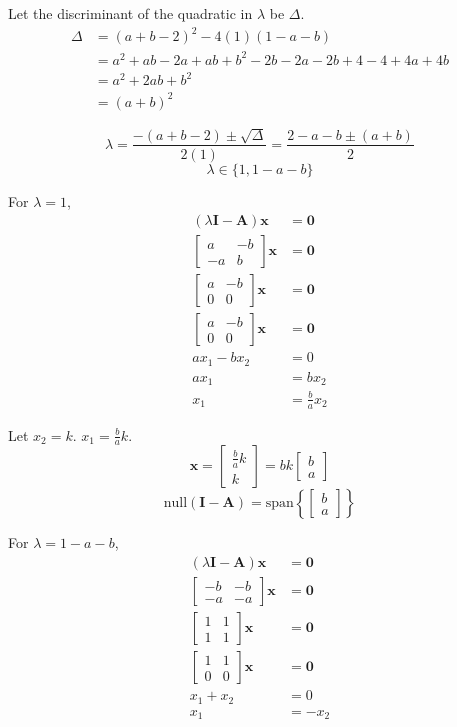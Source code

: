 \documentclass[a4paper]{article}
\newcommand{\vv}{\mathbf}
\newcommand{\nul}{\mathrm{null}}
\newcommand{\spa}{\mathrm{span}}
\begin{document}
Let the discriminant of the quadratic in \(\lambda\) be \(\Delta\).
\[\begin{aligned}
	\Delta&=(a+b-2)^2-4(1)(1-a-b)\\
	      &=a^2+ab-2a+ab+b^2-2b-2a-2b+4-4+4a+4b\\
	      &=a^2+2ab+b^2\\
	      &=(a+b)^2
\end{aligned}\]

\[\lambda=\frac{-(a+b-2)\pm\sqrt{\Delta}}{2(1)}=\frac{2-a-b\pm(a+b)}{2}\]
\[\lambda\in\{1,1-a-b\}\]

For \(\lambda=1\),
\[\begin{aligned}
	(\lambda\vv I-\vv A)\vv x&=\vv0\\
	\begin{bmatrix}
		a&-b\\
		-a&b
	\end{bmatrix}\vv x
				 &=\vv0\\
	\begin{bmatrix}
		a&-b\\
		0&0
	\end{bmatrix}\vv x
				 &=\vv0\\
	\begin{bmatrix}
		a&-b\\
		0&0
	\end{bmatrix}\vv x
				 &=\vv0\\
	ax_1-bx_2&=0\\
	ax_1&=bx_2\\
	x_1&=\frac bax_2
\end{aligned}\]

Let \(x_2=k\). \(x_1=\frac bak\).
\[\vv x=\begin{bmatrix}\frac bak\\k\end{bmatrix}=bk\begin{bmatrix}b\\a\end{bmatrix}\]
\[\nul(\vv I-\vv A)=\spa\left\{\begin{bmatrix}b\\a\end{bmatrix}\right\}\]

For \(\lambda=1-a-b\),
\[\begin{aligned}
	(\lambda\vv I-\vv A)\vv x&=\vv0\\
	\begin{bmatrix}
		-b&-b\\
		-a&-a
	\end{bmatrix}\vv x
				 &=\vv0\\
	\begin{bmatrix}
		1&1\\
		1&1
	\end{bmatrix}\vv x
				 &=\vv0\\
	\begin{bmatrix}
		1&1\\
		0&0
	\end{bmatrix}\vv x
				 &=\vv0\\
	x_1+x_2&=0\\
	x_1&=-x_2
\end{aligned}\]
\end{document}
